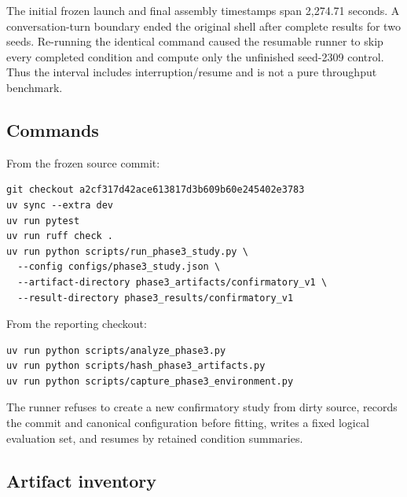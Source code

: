 \documentclass[11pt]{article}
\begin{document}
The initial frozen launch and final assembly timestamps span 2,274.71 seconds.
A conversation-turn boundary ended the original shell after complete results
for two seeds. Re-running the identical command caused the resumable runner to
skip every completed condition and compute only the unfinished seed-2309
control. Thus the interval includes interruption/resume and is not a pure
throughput benchmark.

\subsection{Commands}

From the frozen source commit:

\begin{verbatim}
git checkout a2cf317d42ace613817d3b609b60e245402e3783
uv sync --extra dev
uv run pytest
uv run ruff check .
uv run python scripts/run_phase3_study.py \
  --config configs/phase3_study.json \
  --artifact-directory phase3_artifacts/confirmatory_v1 \
  --result-directory phase3_results/confirmatory_v1
\end{verbatim}

From the reporting checkout:

\begin{verbatim}
uv run python scripts/analyze_phase3.py
uv run python scripts/hash_phase3_artifacts.py
uv run python scripts/capture_phase3_environment.py
\end{verbatim}

The runner refuses to create a new confirmatory study from dirty source,
records the commit and canonical configuration before fitting, writes a fixed
logical evaluation set, and resumes by retained condition summaries.

\subsection{Artifact inventory}
\end{document}
